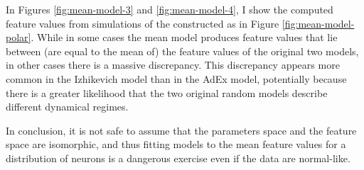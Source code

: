 


In Figures \ref{fig:mean-model-3} and \ref{fig:mean-model-4}, I show the computed feature values from simulations of the constructed as in Figure \ref{fig:mean-model-polar}.
While in some cases the mean model produces feature values that lie between (are equal to the mean of) the feature values of the original two models, in other cases there is a massive discrepancy.
This discrepancy appears more common in the Izhikevich model than in the AdEx model, potentially because there is a greater likelihood that the two original random models describe different dynamical regimes.


In conclusion, it is not safe to assume that the parameters space and the feature space are isomorphic, and thus fitting models to the mean feature values for a distribution of neurons is a dangerous exercise even if the data are normal-like.



